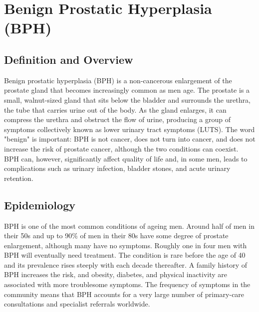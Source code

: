 \chapter{Benign Prostatic Hyperplasia (BPH)}

\section*{Definition and Overview}
Benign prostatic hyperplasia (BPH) is a non-cancerous enlargement of the prostate gland that becomes increasingly common as men age. The prostate is a small, walnut-sized gland that sits below the bladder and surrounds the urethra, the tube that carries urine out of the body. As the gland enlarges, it can compress the urethra and obstruct the flow of urine, producing a group of symptoms collectively known as lower urinary tract symptoms (LUTS). The word "benign" is important: BPH is not cancer, does not turn into cancer, and does not increase the risk of prostate cancer, although the two conditions can coexist. BPH can, however, significantly affect quality of life and, in some men, leads to complications such as urinary infection, bladder stones, and acute urinary retention.

\section*{Epidemiology}
BPH is one of the most common conditions of ageing men. Around half of men in their 50s and up to 90\% of men in their 80s have some degree of prostate enlargement, although many have no symptoms. Roughly one in four men with BPH will eventually need treatment. The condition is rare before the age of 40 and its prevalence rises steeply with each decade thereafter. A family history of BPH increases the risk, and obesity, diabetes, and physical inactivity are associated with more troublesome symptoms. The frequency of symptoms in the community means that BPH accounts for a very large number of primary-care consultations and specialist referrals worldwide.

